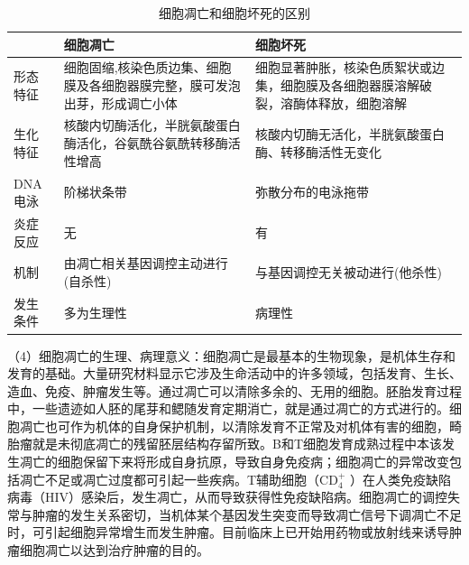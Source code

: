 \begin{table}[ht]
	\caption{细胞凋亡和细胞坏死的区别}
	\label{tab1-1}
	\centering
	\begin{tabular}{lp{5cm}p{5cm}}
		\toprule
		         & 细胞凋亡                                                                           & 细胞坏死                       \\
		\midrule
		形态特征 & 细胞固缩,核染色质边集、细胞膜及各细胞器膜完整，膜可发泡出芽，形成调亡小体
		         & 细胞显著肿胀，核染色质絮状或边集，细胞膜及各细胞器膜溶解破裂，溶酶体释放，细胞溶解                                  \\
		生化特征 & 核酸内切酶活化，半胱氨酸蛋白酶活化，谷氨酰谷氨酰转移酶活性增高
		         & 核酸内切酶无活化，半胱氨酸蛋白酶、转移酶活性无变化                                                                  \\
		DNA电泳  & 阶梯状条带                                                                         & 弥散分布的电泳拖带             \\
		炎症反应 & 无                                                                                 & 有                             \\
		机制     & 由凋亡相关基因调控主动进行(自杀性)                                                 & 与基因调控无关被动进行(他杀性) \\
		发生条件 & 多为生理性                                                                         & 病理性                         \\
		\bottomrule
	\end{tabular}
\end{table}


（4）细胞凋亡的生理、病理意义：细胞凋亡是最基本的生物现象，是机体生存和发育的基础。大量研究材料显示它涉及生命活动中的许多领域，包括发育、生长、造血、免疫、肿瘤发生等。通过凋亡可以清除多余的、无用的细胞。胚胎发育过程中，一些遗迹如人胚的尾芽和鳃随发育定期消亡，就是通过凋亡的方式进行的。细胞凋亡也可作为机体的自身保护机制，以清除发育不正常及对机体有害的细胞，畸胎瘤就是未彻底凋亡的残留胚层结构存留所致。B和T细胞发育成熟过程中本该发生凋亡的细胞保留下来将形成自身抗原，导致自身免疫病；细胞凋亡的异常改变包括凋亡不足或凋亡过度都可引起一些疾病。T辅助细胞（$\text{CD}^+_4$
）在人类免疫缺陷病毒（HIV）感染后，发生凋亡，从而导致获得性免疫缺陷病。细胞凋亡的调控失常与肿瘤的发生关系密切，当机体某个基因发生突变而导致凋亡信号下调凋亡不足时，可引起细胞异常增生而发生肿瘤。目前临床上已开始用药物或放射线来诱导肿瘤细胞凋亡以达到治疗肿瘤的目的。

